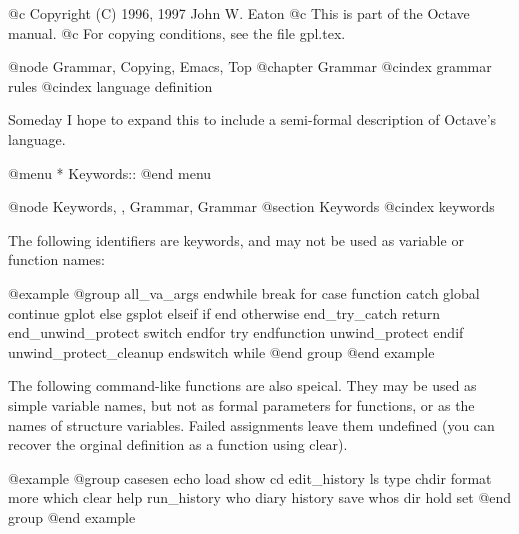 @c Copyright (C) 1996, 1997 John W. Eaton
@c This is part of the Octave manual.
@c For copying conditions, see the file gpl.tex.

@node Grammar, Copying, Emacs, Top
@chapter Grammar
@cindex grammar rules
@cindex language definition

Someday I hope to expand this to include a semi-formal description of
Octave's language.

@menu
* Keywords::                    
@end menu

@node Keywords,  , Grammar, Grammar
@section Keywords
@cindex keywords

The following identifiers are keywords, and may not be used as variable
or function names:

@example
@group
all_va_args             endwhile
break                   for
case                    function
catch                   global
continue                gplot
else                    gsplot
elseif                  if
end                     otherwise
end_try_catch           return
end_unwind_protect      switch
endfor                  try
endfunction             unwind_protect
endif                   unwind_protect_cleanup
endswitch               while
@end group
@end example

The following command-like functions are also speical.  They may be used
as simple variable names, but not as formal parameters for functions, or
as the names of structure variables.  Failed assignments leave them
undefined (you can recover the orginal definition as a function using
clear).

@example
@group
casesen       echo          load          show
cd            edit_history  ls            type
chdir         format        more          which
clear         help          run_history   who
diary         history       save          whos
dir           hold          set
@end group
@end example
